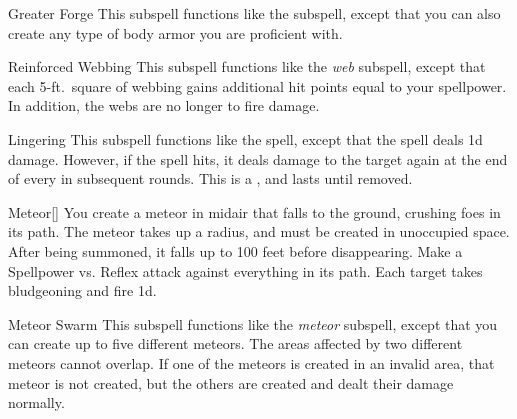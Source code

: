 \begin{ability}[\nth{3}]{Greater Forge}
This subspell functions like the  subspell, except that you can also create any type of body armor you are proficient with.
\end{ability}
\vspace{0.25em}


\begin{ability}[\nth{4}]{Reinforced Webbing}
This subspell functions like the \textit{web} subspell, except that each 5-ft.\ square of webbing gains additional hit points equal to your spellpower.
In addition, the webs are no longer  to fire damage.
\end{ability}
\vspace{0.25em}


\begin{ability}[\nth{5}]{Lingering}
This subspell functions like the  spell, except that the spell deals \minus1d damage.
However, if the spell hits, it deals damage to the target again at the end of every  in subsequent rounds.
This is a , and lasts until removed.
\end{ability}
\vspace{0.25em}


\begin{ability}[\nth{5}]{Meteor}[]
You create a meteor in midair that falls to the ground, crushing foes in its path.
The meteor takes up a \areamed radius, and must be created in unoccupied space.
After being summoned, it falls up to 100 feet before disappearing.
Make a Spellpower vs. Reflex attack against everything in its path.
\hit Each target takes bludgeoning and fire  \minus1d.
\end{ability}
\vspace{0.25em}


\begin{ability}[\nth{8}]{Meteor Swarm}
This subspell functions like the \textit{meteor} subspell, except that you can create up to five different meteors.
The areas affected by two different meteors cannot overlap.
If one of the meteors is created in an invalid area, that meteor is not created, but the others are created and dealt their damage normally.
\end{ability}
\vspace{0.25em}

